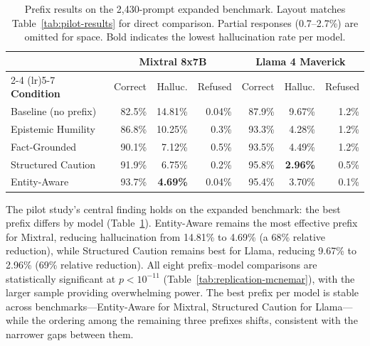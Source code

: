 \begin{table}[ht]
\centering
\small
\begin{tabular}{l rr r rr r}
\toprule
& \multicolumn{3}{c}{\textbf{Mixtral 8x7B}} & \multicolumn{3}{c}{\textbf{Llama 4 Maverick}} \\
\cmidrule(lr){2-4} \cmidrule(lr){5-7}
\textbf{Condition} & Correct & Halluc. & Refused & Correct & Halluc. & Refused \\
\midrule
Baseline (no prefix)   & 82.5\% & 14.81\% & 0.04\% & 87.9\% & 9.67\% & 1.2\% \\[3pt]
Epistemic Humility     & 86.8\% & 10.25\% & 0.3\%  & 93.3\% & 4.28\% & 1.2\% \\
Fact-Grounded          & 90.1\% &  7.12\% & 0.5\%  & 93.5\% & 4.49\% & 1.2\% \\
Structured Caution     & 91.9\% &  6.75\% & 0.2\%  & 95.8\% & \textbf{2.96\%} & 0.5\% \\
Entity-Aware           & 93.7\% & \textbf{4.69\%} & 0.04\% & 95.4\% & 3.70\% & 0.1\% \\
\bottomrule
\end{tabular}
\caption[Replication results on the expanded benchmark]{Prefix results on the 2,430-prompt expanded benchmark. Layout matches Table~\ref{tab:pilot-results} for direct comparison. Partial responses (0.7--2.7\%) are omitted for space. Bold indicates the lowest hallucination rate per model.}
\label{tab:replication-results}
\end{table}

The pilot study's central finding holds on the expanded benchmark: the best prefix differs by model (Table~\ref{tab:replication-results}).  Entity-Aware remains the most effective prefix for Mixtral, reducing hallucination from 14.81\% to 4.69\% (a 68\% relative reduction), while Structured Caution remains best for Llama, reducing 9.67\% to 2.96\% (69\% relative reduction). All eight prefix--model comparisons are statistically significant at $p < 10^{-11}$ (Table~\ref{tab:replication-mcnemar}), with the larger sample providing overwhelming power. The best prefix per model is stable across benchmarks---Entity-Aware for Mixtral, Structured Caution for Llama---while the ordering among the remaining three prefixes shifts, consistent with the narrower gaps between them.

